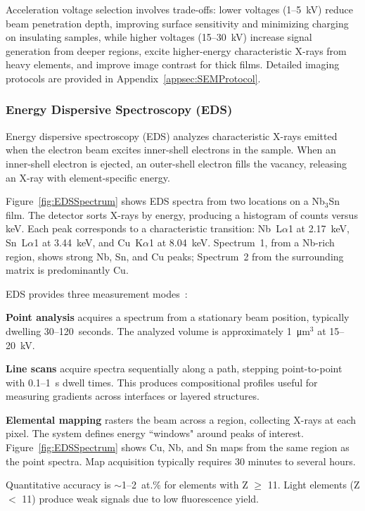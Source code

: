     Acceleration voltage selection involves trade-offs: lower voltages (1--5~kV) reduce beam penetration depth, improving surface sensitivity and minimizing charging on insulating samples, while higher voltages (15--30~kV) increase signal generation from deeper regions, excite higher-energy characteristic X-rays from heavy elements, and improve image contrast for thick films. Detailed imaging protocols are provided in Appendix~\ref{appsec:SEMProtocol}.

    \subsubsection{Energy Dispersive Spectroscopy (EDS)}
        
    Energy dispersive spectroscopy (EDS) analyzes characteristic X-rays emitted when the electron beam excites inner-shell electrons in the sample. When an inner-shell electron is ejected, an outer-shell electron fills the vacancy, releasing an X-ray with element-specific energy.
        
    Figure~\ref{fig:EDSSpectrum} shows EDS spectra from two locations on a Nb$_3$Sn film. The detector sorts X-rays by energy, producing a histogram of counts versus keV. Each peak corresponds to a characteristic transition: Nb~L$\alpha$1 at 2.17~keV, Sn~L$\alpha$1 at 3.44~keV, and Cu~K$\alpha$1 at 8.04~keV. Spectrum~1, from a Nb-rich region, shows strong Nb, Sn, and Cu peaks; Spectrum~2 from the surrounding matrix is predominantly Cu.
        
    EDS provides three measurement modes~\cite{AZtecUserManual2023}:
        
    \textbf{Point analysis} acquires a spectrum from a stationary beam position, typically dwelling 30--120~seconds. The analyzed volume is approximately 1~\unit{\um}$^3$ at 15--20~kV.
        
    \textbf{Line scans} acquire spectra sequentially along a path, stepping point-to-point with 0.1--1~s dwell times. This produces compositional profiles useful for measuring gradients across interfaces or layered structures.
        
    \textbf{Elemental mapping} rasters the beam across a region, collecting X-rays at each pixel. The system defines energy ``windows" around peaks of interest. Figure~\ref{fig:EDSSpectrum} shows Cu, Nb, and Sn maps from the same region as the point spectra. Map acquisition typically requires 30 minutes to several hours.
    
    Quantitative accuracy is $\sim$1--2~at.\% for elements with Z $\geq$ 11. Light elements (Z $<$ 11) produce weak signals due to low fluorescence yield.


